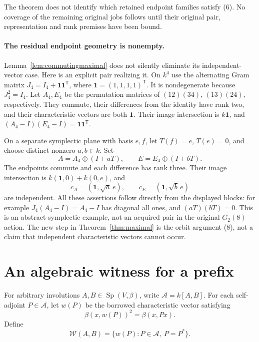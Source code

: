 \documentclass[11pt]{article}
\newcommand{\Sp}{\operatorname{Sp}}
\begin{document}
The theorem does not identify which retained endpoint families satisfy
(6). No coverage of the remaining original jobs follows until their
original pair, representation and rank premises have been bound.

\paragraph{The residual endpoint geometry is nonempty.}
Lemma~\ref{lem:commutingmaximal} does not silently eliminate its
independent-vector case. Here is an explicit pair realizing it.
On \(k^4\) use the alternating Gram matrix
\(J_4=I_4+\mathbf1\mathbf1^{\mathsf T}\), where
\(\mathbf1=(1,1,1,1)^{\mathsf T}\).
It is nondegenerate because \(J_4^2=I_4\).
Let \(A_4,E_4\) be the permutation matrices of
\((12)(34)\), \((13)(24)\), respectively.
They commute, their differences from the identity have rank two,
and their characteristic vectors are both \(\mathbf1\).
Their image intersection is \(k\mathbf1\), and
\((A_4-I)(E_4-I)=\mathbf1\mathbf1^{\mathsf T}\).

On a separate symplectic plane with basis \(e,f\), let
\(T(f)=e\), \(T(e)=0\), and choose distinct nonzero \(a,b\in k\).
Set
\[
 A=A_4\oplus(I+aT),\qquad E=E_4\oplus(I+bT).
\]
The endpoints commute and each difference has rank three.
Their image intersection is
\(k(\mathbf1,0)+k(0,e)\), and
\[
 c_A=(\mathbf1,\sqrt a\,e),\qquad
 c_E=(\mathbf1,\sqrt b\,e)
\]
are independent.
All these assertions follow directly from the displayed blocks:
for example \(J_4(A_4-I)=A_4-I\) has diagonal all ones,
and \((aT)(bT)=0\).
This is an abstract symplectic example, not an acquired pair in the
original \(G_2(8)\) action. The new step in
Theorem~\ref{thm:maximal} is the orbit argument (8), not a claim
that independent characteristic vectors cannot occur.

\section{An algebraic witness for a prefix}

For arbitrary involutions \(A,B\in\Sp(V,\beta)\), write
\(\mathcal A=k[A,B]\). For each self-adjoint \(P\in\mathcal A\),
let \(w(P)\) be the borrowed characteristic vector satisfying
\[
                    \beta(x,w(P))^2=\beta(x,Px).
\]
Define
\[
 \mathcal W(A,B)=\{w(P):P\in\mathcal A,\ P=P^*\}.
                                                               \tag{9}
\]
\end{document}
